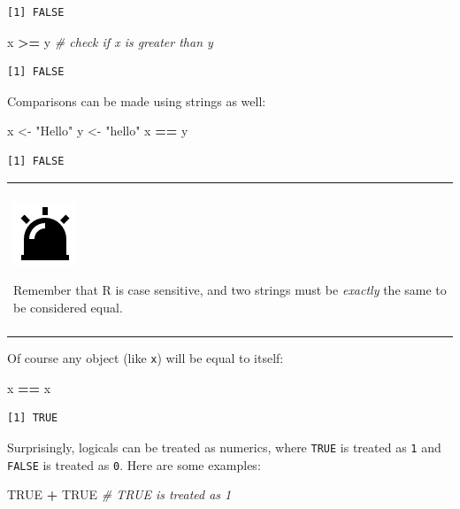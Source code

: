 \documentclass[
]{book}
\newenvironment{Shaded}{\begin{snugshade}}{\end{snugshade}}
\newcommand{\CommentTok}[1]{\textcolor[rgb]{0.56,0.35,0.01}{\textit{#1}}}
\newcommand{\NormalTok}[1]{#1}
\newcommand{\OperatorTok}[1]{\textcolor[rgb]{0.81,0.36,0.00}{\textbf{#1}}}
\newcommand{\OtherTok}[1]{\textcolor[rgb]{0.56,0.35,0.01}{#1}}
\newcommand{\StringTok}[1]{\textcolor[rgb]{0.31,0.60,0.02}{#1}}
\newenvironment{caution}
{
  \begin{center}
  \begin{tabular}{|>{\columncolor{caution}}p{0.9\textwidth}|}
  \hline\\
  \includegraphics[scale=0.1]{src/images/alarm-warning-fill.png}
}
{\\\\\hline
  \end{tabular}
  \end{center}
}
\begin{document}
\begin{verbatim}
[1] FALSE
\end{verbatim}

\begin{Shaded}
\begin{Highlighting}[]
\NormalTok{x }\OperatorTok{>=}\StringTok{ }\NormalTok{y  }\CommentTok{# check if x is greater than y }
\end{Highlighting}
\end{Shaded}

\begin{verbatim}
[1] FALSE
\end{verbatim}

Comparisons can be made using strings as well:

\begin{Shaded}
\begin{Highlighting}[]
\NormalTok{x <-}\StringTok{ "Hello"}
\NormalTok{y <-}\StringTok{ "hello"}
\NormalTok{x }\OperatorTok{==}\StringTok{ }\NormalTok{y}
\end{Highlighting}
\end{Shaded}

\begin{verbatim}
[1] FALSE
\end{verbatim}

\begin{caution}
Remember that R is case sensitive, and two strings must be
\emph{exactly} the same to be considered equal.
\end{caution}

Of course any object (like \texttt{x}) will be equal to itself:

\begin{Shaded}
\begin{Highlighting}[]
\NormalTok{x }\OperatorTok{==}\StringTok{ }\NormalTok{x}
\end{Highlighting}
\end{Shaded}

\begin{verbatim}
[1] TRUE
\end{verbatim}

Surprisingly, logicals can be treated as numerics, where \texttt{TRUE} is treated as \texttt{1} and \texttt{FALSE} is treated as \texttt{0}.
Here are some examples:

\begin{Shaded}
\begin{Highlighting}[]
\OtherTok{TRUE} \OperatorTok{+}\StringTok{ }\OtherTok{TRUE}  \CommentTok{# TRUE is treated as 1}
\end{Highlighting}
\end{Shaded}
\end{document}

